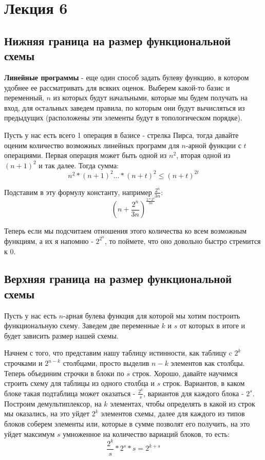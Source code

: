 \documentclass{article}
\begin{document}
\section{Лекция 6}
\subsection{Нижняя граница на размер функциональной схемы}
\textbf{Линейные программы} - еще один способ задать булеву функцию, в котором удобнее ее рассматривать для всяких оценок. Выберем какой-то базис и переменный, $n$ из которых будут начальными, которые мы будем получать на вход, для остальных заведем правила, по которым они будут вычисляться из предыдущих (расположены эти элементы будут в топологическом порядке).

Пусть у нас есть всего 1 операция в базисе - стрелка Пирса, тогда давайте оценим количество возможных линейных программ для $n$-арной функции с $t$ операциями. Первая операция может быть одной из $n^2$, вторая одной из $(n+1)^2$ и так далее. Тогда сумма: $$n^2*(n+1)^2\dots *(n+t)^2\leq(n+t)^{2t}$$

Подставим в эту формулу константу, например $\frac{2^n}{3n}$: $$\displaystyle\left(n+\frac{2^n}{3n}\right)^{\frac{2*2^n}{3n}}$$

Теперь если мы подсчитаем отношения этого количества ко всем возможным функциям, а их я напомню - $2^{2^n}$, то поймете, что оно довольно быстро стремится к 0.

\subsection{Верхняя граница на размер функциональной схемы}
Пусть у нас есть $n$-арная булева функция для которой мы хотим построить функциональную схему. Заведем две переменные $k$ и $s$ от которых в итоге и будет зависить размер нашей схемы. 

Начнем с того, что представим нашу таблицу истинности, как таблицу c $2^k$ строчками и $2^{n-k}$ столбцами, просто выделив $n-k$ элементов как столбцы. Теперь объединим строчки в блоки по $s$ строк. Хорошо, давайте научимся строить схему для таблицы из одного столбца и $s$ строк. Вариантов, в каком блоке такая подтаблица может оказаться - $\frac{2^k}{s}$, вариантов для каждого блока - $2^s$. Построим демультиплексор, на $k$ элементах, чтобы определять в какой из строк мы оказались, на это уйдет $2^k$ элементов схемы, далее для каждого из типов блоков соберем элементы или, которые в сумме позволят его получить, на это уйдет максимум $s$  умноженное на количество вариаций блоков, то есть: $$\frac{2^k}{s}*2^s*s=2^{k+s}$$
\end{document}
